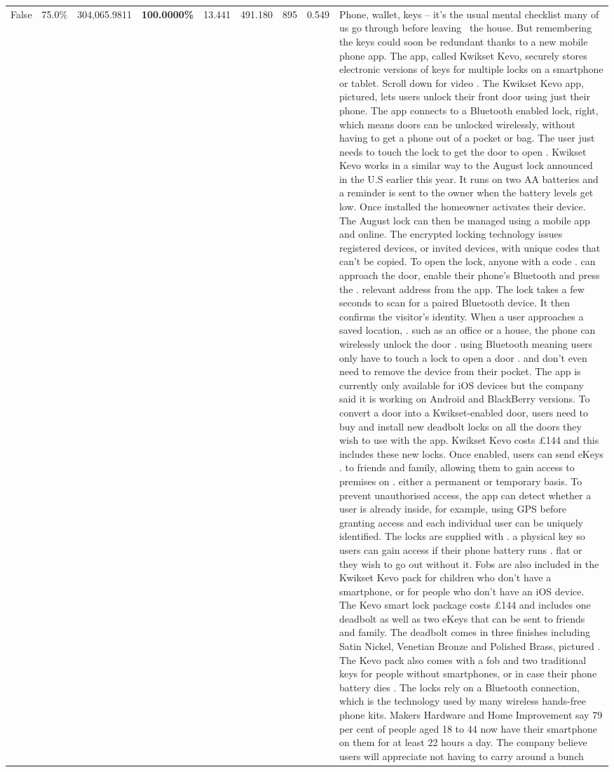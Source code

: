 \begin{table}[H]
\begin{tabular}{lllrlllll}
False & 75.0\% & 304,065.9811 & \bfseries \color{red} 100.0000\% & 13.441 & 491.180 & 895 & 0.549 & Phone, wallet, keys – it’s the usual mental checklist many of us go through before leaving  the house. But remembering the keys could soon be redundant thanks to a new mobile phone app. The app, called Kwikset Kevo, securely stores electronic versions of keys for multiple locks on a smartphone or tablet. Scroll down for video . The Kwikset Kevo app, pictured, lets users unlock their front door using just their phone. The app connects to a Bluetooth enabled lock, right, which means doors can be unlocked wirelessly, without having to get a phone out of a pocket or bag. The user just needs to touch the lock to get the door to open . Kwikset Kevo works in a similar way to the August lock announced in the U.S earlier this year. It runs on two AA batteries and a reminder is sent to the owner when the battery levels get low. Once installed the homeowner activates their device. The August lock can then be managed using a mobile app and online. The encrypted locking technology issues registered devices, or invited devices, with unique codes that can't be copied. To open the lock, anyone with a code . can approach the door, enable their phone's Bluetooth and press the . relevant address from the app. The lock takes a few seconds to scan for a paired Bluetooth device. It then confirms the visitor's identity. When a user approaches a saved location, . such as an office or a house, the phone can wirelessly unlock the door . using Bluetooth meaning users only have to touch a lock to open a door . and don't even need to remove the device from their pocket. The app is currently only available for iOS devices but the company said it is working on Android and BlackBerry versions. To convert a door into a Kwikset-enabled door, users need to buy and install new deadbolt locks on all the doors they wish to use with the app. Kwikset Kevo costs £144 and this includes these new locks. Once enabled, users can send eKeys . to friends and family, allowing them to gain access to premises on . either a permanent or temporary basis. To prevent unauthorised access, the app can detect whether a user is already inside, for example, using GPS before granting access and each individual user can be uniquely identified. The locks are supplied with . a physical key so users can gain access if their phone battery runs . flat or they wish to go out without it. Fobs are also included in the Kwikset Kevo pack for children who don't have a smartphone, or for people who don't have an iOS device. The Kevo smart lock package costs £144 and includes one deadbolt as well as two eKeys that can be sent to friends and family. The deadbolt comes in three finishes including Satin Nickel, Venetian Bronze and Polished Brass, pictured . The Kevo pack also comes with a fob and two traditional keys for people without smartphones, or in case their phone battery dies . The locks rely on a Bluetooth connection, which is the technology used by many wireless hands-free phone kits. Makers Hardware and Home Improvement say 79 per cent of people aged 18 to 44 now have their smartphone on them for at least 22 hours a day. The company believe users will appreciate not having to carry around a bunch 
\end{tabular}
\end{table}
